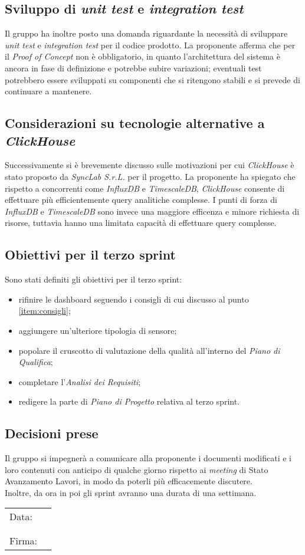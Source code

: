 \documentclass[italian,12pt]{article}
\begin{document}
\newpage
\subsection{Sviluppo di \textit{unit test} e \textit{integration test}}
Il gruppo ha inoltre posto una domanda riguardante la necessità di sviluppare \textit{unit test} e \textit{integration test} per il codice prodotto.
La proponente afferma che per il \textit{Proof of Concept} non è obbligatorio, in quanto l'architettura del sistema è ancora in fase di definizione
e potrebbe subire variazioni; eventuali test potrebbero essere sviluppati su componenti che si ritengono stabili e si prevede di continuare a mantenere.

\subsection{Considerazioni su tecnologie alternative a \textit{ClickHouse}}
Successivamente si è brevemente discusso sulle motivazioni per cui \textit{ClickHouse} è stato proposto da \textit{SyncLab S.r.L.} per il progetto. La proponente ha spiegato che
rispetto a concorrenti come \textit{InfluxDB} e \textit{TimescaleDB}, \textit{ClickHouse}
consente di effettuare più efficientemente query analitiche complesse.
I punti di forza di \textit{InfluxDB} e \textit{TimescaleDB} sono invece una maggiore efficenza e minore richiesta di risorse, tuttavia
hanno una limitata capacità di effettuare query complesse.

\subsection{Obiettivi per il terzo sprint}
Sono stati definiti gli obiettivi per il terzo sprint:
\begin{itemize}
	\item rifinire le dashboard seguendo i consigli di cui discusso al punto \ref{item:consigli};
	\item aggiungere un'ulteriore tipologia di sensore;
	\item popolare il cruscotto di valutazione della qualità all'interno del \textit{Piano di Qualifica};
	\item completare l'\textit{Analisi dei Requisiti};
	\item redigere la parte di \textit{Piano di Progetto} relativa al terzo sprint.
\end{itemize}

\subsection{Decisioni prese}
Il gruppo si impegnerà a comunicare alla proponente i documenti modificati e i loro contenuti con anticipo di qualche giorno rispetto ai \textit{meeting}
di Stato Avanzamento Lavori, in modo da poterli più efficacemente discutere.\\
Inoltre, da ora in poi gli sprint avranno una durata di una settimana.

\newpage
\begin{table}[b]
	\begin{tabular}{@{}p{.5in}p{4in}@{}}
		Data:  & \hrulefill \\
		       &            \\
		       &            \\
		Firma: & \hrulefill \\
	\end{tabular}
\end{table}
\end{document}
